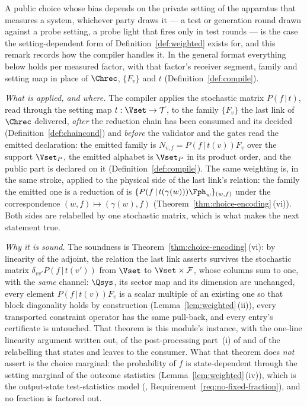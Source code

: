 \begin{remark}\label{rem:relabel}
A public choice whose bias depends on the private setting of the apparatus
that measures a system, whichever party draws it --- a test or
generation round drawn against a probe setting, a probe light that fires
only in test rounds --- is the case the setting-dependent form of
Definition~\ref{def:weighted} exists for, and this remark records how the
compiler handles it. In the general format everything below holds per
measured factor, with that factor's receiver segment, family and setting map
in place of $\Chrec$, $\{F_v\}$ and $t$ (Definition~\ref{def:compile}).

\emph{What is applied, and where.} The compiler applies the stochastic matrix
$P(f\,|\,t)$, read through the setting map $t:\Vset\to\mathcal{T}$, to the
family $\{F_v\}$ the last link of $\Chrec$ delivered, \emph{after} the
reduction chain has been consumed and its
 decided
(Definition~\ref{def:chaincond}) and \emph{before} the validator and the
gates read the emitted declaration: the emitted family is
$N_{v,f}=P(f\,|\,t(v))F_v$ over the support $\Vset_P$, the emitted alphabet is
$\Vset_P$ in its product order, and the public part is declared on it
(Definition~\ref{def:compile}). The same weighting is, in the same stroke,
applied to the physical side of the last link's relation: the family the
emitted one is a reduction of is
$\{P(f\,|\,t(\gamma(w)))\Fph_w\}_{(w,f)}$ under the correspondence
$(w,f)\mapsto(\gamma(w),f)$ (Theorem~\ref{thm:choice-encoding}\,(vi)). Both sides are
relabelled by one stochastic matrix, which is what makes the next statement
true.

\emph{Why it is sound.} The soundness is
Theorem~\ref{thm:choice-encoding}\,(vi): by linearity of the adjoint, the
relation the last link asserts survives the stochastic matrix
$\delta_{vv'}P(f\,|\,t(v'))$ from $\Vset$ to $\Vset\times\mathcal{F}$, whose
columns sum to one, with the \emph{same} channel:
$\Qsys$, its sector map and its dimension are unchanged, every element
$P(f\,|\,t(v))F_v$ is a scalar multiple of an existing one so that block
diagonality holds by construction (Lemma~\ref{lem:weighted}\,(ii)), every
transported constraint operator has the same pull-back, and every entry's
certificate is untouched. That theorem is this module's instance, with the
one-line linearity argument written out, of the post-processing part~(i) of
 and of the relabelling that
 states and leaves to the consumer. What
that theorem does \emph{not}
assert is the choice marginal: the probability of $f$ is state-dependent
through the setting marginal of the outcome statistics
(Lemma~\ref{lem:weighted}\,(iv)), which is the output-state test-statistics
model (, Requirement~\ref{req:no-fixed-fraction}),
and no fraction is factored out.


\end{remark}
